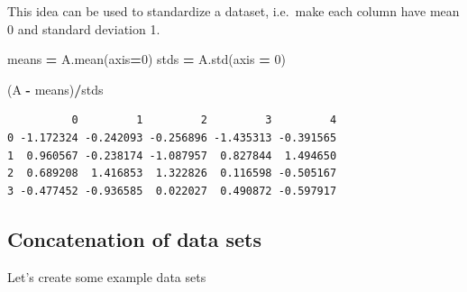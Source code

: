 \documentclass[
  letterpaper,
]{scrbook}
\newenvironment{Shaded}{\begin{snugshade}}{\end{snugshade}}
\newcommand{\DecValTok}[1]{\textcolor[rgb]{0.00,0.00,0.81}{#1}}
\newcommand{\NormalTok}[1]{#1}
\newcommand{\OperatorTok}[1]{\textcolor[rgb]{0.81,0.36,0.00}{\textbf{#1}}}
\begin{document}
This idea can be used to standardize a dataset, i.e.~make each column have mean 0 and standard deviation 1.

\begin{Shaded}
\begin{Highlighting}[]
\NormalTok{means }\OperatorTok{=}\NormalTok{ A.mean(axis}\OperatorTok{=}\DecValTok{0}\NormalTok{)}
\NormalTok{stds }\OperatorTok{=}\NormalTok{ A.std(axis }\OperatorTok{=} \DecValTok{0}\NormalTok{)}

\NormalTok{(A }\OperatorTok{-}\NormalTok{ means)}\OperatorTok{/}\NormalTok{stds}
\end{Highlighting}
\end{Shaded}

\begin{verbatim}
          0         1         2         3         4
0 -1.172324 -0.242093 -0.256896 -1.435313 -0.391565
1  0.960567 -0.238174 -1.087957  0.827844  1.494650
2  0.689208  1.416853  1.322826  0.116598 -0.505167
3 -0.477452 -0.936585  0.022027  0.490872 -0.597917
\end{verbatim}

\hypertarget{concatenation-of-data-sets}{%
\subsection{Concatenation of data sets}\label{concatenation-of-data-sets}}

Let's create some example data sets
\end{document}
